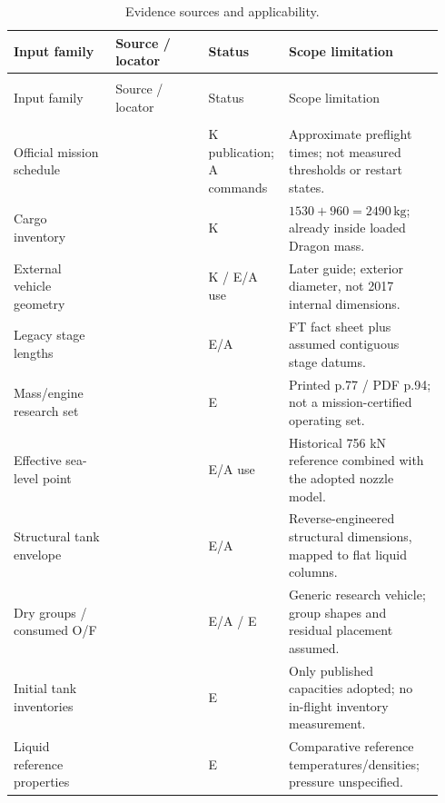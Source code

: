 \begingroup\small\setlength{\tabcolsep}{4pt}\renewcommand{\arraystretch}{1.1}
\begin{longtable}{@{}>{\raggedright\arraybackslash}p{0.23\linewidth}>{\raggedright\arraybackslash}p{0.21\linewidth}>{\raggedright\arraybackslash}p{0.15\linewidth}>{\raggedright\arraybackslash}p{0.35\linewidth}@{}}
\caption{Evidence sources and applicability.}\label{tab:app-sources}\\
\toprule
Input family & Source / locator & Status & Scope limitation \\
\midrule\endfirsthead
\multicolumn{4}{l}{\small\textit{Table \ref{tab:app-sources} continued}}\\
\toprule
Input family & Source / locator & Status & Scope limitation \\
\midrule\endhead
\midrule\multicolumn{4}{r}{\small\textit{Continued on next page}}\\\endfoot
\bottomrule\endlastfoot
Official mission schedule & \cite[PDF p.~2]{nasacrs10press} & K publication; A commands & Approximate preflight times; not measured thresholds or restart states. \\
Cargo inventory & \cite{nasacrs10overview} & K & $1530+960=2490\,\mathrm{kg}$; already inside loaded Dragon mass. \\
External vehicle geometry & \cite[Table 2-1]{spacexguide2025} & K / E/A use & Later guide; exterior diameter, not 2017 internal dimensions. \\
Legacy stage lengths & \cite{faa2018} & E/A & FT fact sheet plus assumed contiguous stage datums. \\
Mass/engine research set & \cite[Tables 2.16--2.18]{pezent2024} & E & Printed p.77 / PDF p.94; not a mission-certified operating set. \\
Effective sea-level point & \cite[Sec.2.2, p.11]{spacex2015} & E/A use & Historical 756 kN reference combined with the adopted nozzle model. \\
Structural tank envelope & \cite[Table 1]{ecker2017} & E/A & Reverse-engineered structural dimensions, mapped to flat liquid columns. \\
Dry groups / consumed O/F & \cite[Table 2 / Sec.2.2]{bykerk2023} & E/A / E & Generic research vehicle; group shapes and residual placement assumed. \\
Initial tank inventories & \cite[Table 1, p.215]{romerocalco2023} & E & Only published capacities adopted; no in-flight inventory measurement. \\
Liquid reference properties & \cite[Table 5, PDF p.24]{miquel2020} & E & Comparative reference temperatures/densities; pressure unspecified. \\

\end{longtable}
